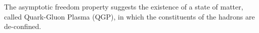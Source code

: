 The asymptotic freedom property suggests the existence of a state of matter, called Quark-Gluon Plasma (QGP), in which the constituents of the hadrons are de-confined.



\newpage
